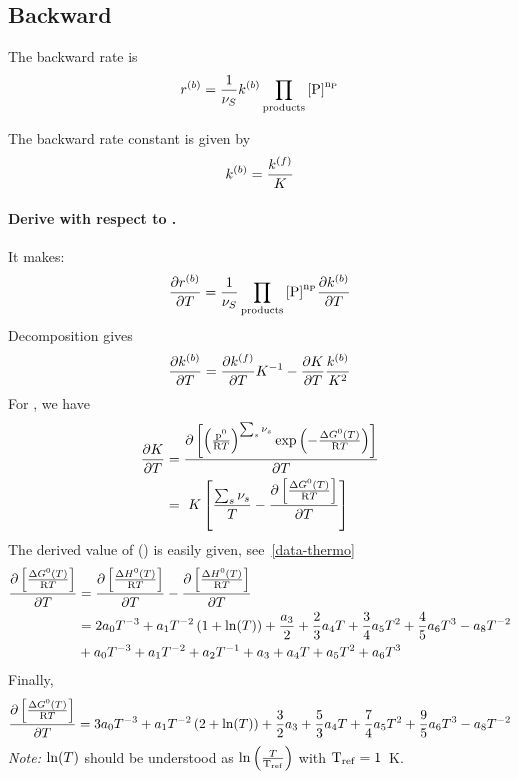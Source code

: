 \subsection{Backward}

The backward rate is
\begin{equation}
\bkwdrate = \frac{1}{\scoef[S]}\bkwdratecons\prodProd
\end{equation}

The backward rate constant is given by
\begin{equation}
\bkwdratecons = \frac{\fwdratecons}{\Eqconst}
\end{equation}

\paragraph{Derive with respect to \Temp.}
It makes:
\begin{equation}
\doverdT{\bkwdrate} = \frac{1}{\scoef[S]}\prodProd\doverdT{\bkwdratecons}
\end{equation}
Decomposition gives
\begin{equation}
\doverdT{\bkwdratecons} = \doverdT{\fwdratecons}\Eqconst^{-1} - \doverdT{\Eqconst}\frac{\bkwdratecons}{\Eqconst^{2}}
\label{rateb-decomp}
\end{equation}
For \Eqconst, we have
\begin{equation}
\begin{split}
\doverdT{\Eqconst} & = \doverdT{\left[\left(\frac{\pz}{\Rg \Temp}\right)^{\sum_s \scoef[s]} \exp\left(-\frac{\DGibbsZ(\Temp)}{\Rg \Temp}\right)\right]} \\
                   & = \Eqconst\left[\frac{\sum_s\scoef[s]}{\Temp} - \doverdT{\left[\frac{\DGibbsZ(\Temp)}{\Rg \Temp}\right]}\right]
\end{split}
\end{equation}
The derived value of \DGibbsZ(\Temp) is easily given, see~\ref{data-thermo}
\begin{equation}
\begin{split}
\doverdT{\left[\frac{\DGibbsZ(\Temp)}{\Rg \Temp}\right]} 
        &= \doverdT{\left[\frac{\DenthZ(T)}{\Rg \Temp}\right]} - \doverdT{\left[\frac{\DenthZ(\Temp)}{\Rg \Temp}\right]} \\
        &= 2\tc{0}\Temp^{-3} + \tc{1}\Temp^{-2}\left(1+\ln(\Temp)\right) + \frac{\tc{3}}{2} + 
           \frac{2}{3}\tc{4}\Temp + \frac{3}{4}\tc{5}\Temp^{2} + \frac{4}{5}\tc{6}\Temp^3 - \tc{8}\Temp^{-2}\\
        &+ \tc{0}\Temp^{-3} + \tc{1}\Temp^{-2} + \tc{2}\Temp^{-1} + \tc{3} + \tc{4}\Temp + \tc{5} \Temp^{2} + \tc{6} \Temp^{3}
\end{split}
\end{equation}
Finally,
\begin{equation}
\doverdT{\left[\frac{\DGibbsZ(\Temp)}{\Rg \Temp}\right]} =
        3\tc{0}\Temp^{-3} + \tc{1} \Temp^{-2} \left(2 + \ln(\Temp)\right) + \frac{3}{2} \tc{3} + \frac{5}{3} \tc{4} \Temp
        + \frac{7}{4}\tc{5} \Temp^2 + \frac{9}{5}\tc{6} \Temp^3 - \tc{8} \Temp^{-2}
\end{equation}
\emph{Note:} $\ln(\Temp)$ should be understood as $\ln\left(\frac{\Temp}{\mathrm{\Temp_{ref}}}\right)$ with 
$\mathrm{\Temp_{ref}} = 1$~K.

